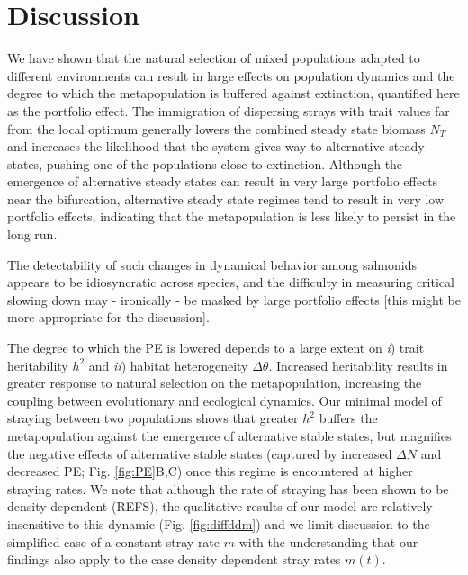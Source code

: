\documentclass[twocolumn,preprintnumbers,amsmath,amssymb,superscriptaddress]{revtex4}
\begin{document}
\section{Discussion}

We have shown that the natural selection of mixed populations adapted to different environments can result in large effects on population dynamics and the degree to which the metapopulation is buffered against extinction, quantified here as the portfolio effect.
The immigration of dispersing strays with trait values far from the local optimum generally lowers the combined steady state biomass $N_T$ and increases the likelihood that the system gives way to alternative steady states, pushing one of the populations close to extinction.
Although the emergence of alternative steady states can result in very large portfolio effects near the bifurcation, alternative steady state regimes tend to result in very low portfolio effects, indicating that the metapopulation is less likely to persist in the long run.

The detectability of such changes in dynamical behavior among salmonids appears to be idiosyncratic across species, and the difficulty in measuring critical slowing down may - ironically - be masked by large portfolio effects \cite{Krkosek:2014ch} [this might be more appropriate for the discussion].

The degree to which the PE is lowered depends to a large extent on \emph{i}) trait heritability $h^2$ and \emph{ii}) habitat heterogeneity $\Delta \theta$.
Increased heritability results in greater response to natural selection on the metapopulation, increasing the coupling between evolutionary and ecological dynamics. 
Our minimal model of straying between two populations shows that greater $h^2$ buffers the metapopulation against the emergence of alternative stable states, but magnifies the negative effects of alternative stable states (captured by increased $\Delta N$ and decreased PE; Fig. \ref{fig:PE}B,C) once this regime is encountered at higher straying rates.
We note that although the rate of straying has been shown to be density dependent (REFS), the qualitative results of our model are relatively insensitive to this dynamic (Fig. \ref{fig:diffddm}) and we limit discussion to the simplified case of a constant stray rate $m$ with the understanding that our findings also apply to the case density dependent stray rates $m(t)$.
\end{document}
